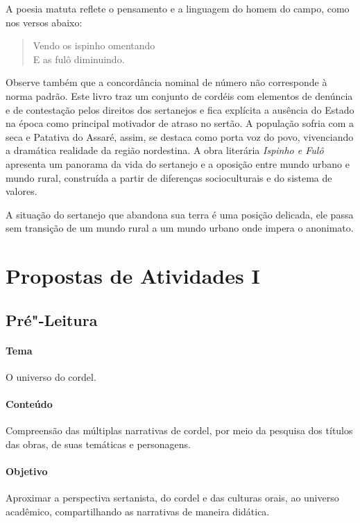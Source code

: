 \documentclass[12pt]{extarticle}
\begin{document}
A poesia matuta reflete o pensamento e a linguagem do homem do campo, 
como nos versos abaixo:  

\begin{verse}
Vendo os ispinho omentando\\
E as fulô diminuindo.\\
\end{verse}
 
Observe também que a concordância nominal de número não corresponde à 
norma padrão. 
Este livro traz um conjunto de cordéis com elementos de denúncia e de 
contestação pelos direitos dos sertanejos e fica explícita a ausência 
do Estado na época como principal motivador de atraso no sertão. A 
população sofria com a seca e Patativa do Assaré, assim, se destaca como 
porta voz do povo, vivenciando a dramática realidade da região nordestina. 
A obra literária \emph{Ispinho e Fulô} apresenta um panorama da vida do 
sertanejo e a oposição entre mundo urbano e mundo rural, construída a 
partir de diferenças socioculturais e do sistema de valores. 
 
A situação do sertanejo que abandona sua terra é uma posição delicada, 
ele passa sem transição de um mundo rural a um mundo urbano onde 
impera o anonimato. 

\section{Propostas de Atividades I}

\subsection{Pré"-Leitura}

\paragraph{Tema} O universo do cordel.

\paragraph{Conteúdo} Compreensão das múltiplas narrativas de cordel, por 
meio da pesquisa dos títulos das obras, de suas temáticas e personagens. 

\paragraph{Objetivo} Aproximar a perspectiva sertanista, do cordel e das 
culturas orais, ao universo acadêmico, compartilhando as narrativas de 
maneira didática.
\end{document}
